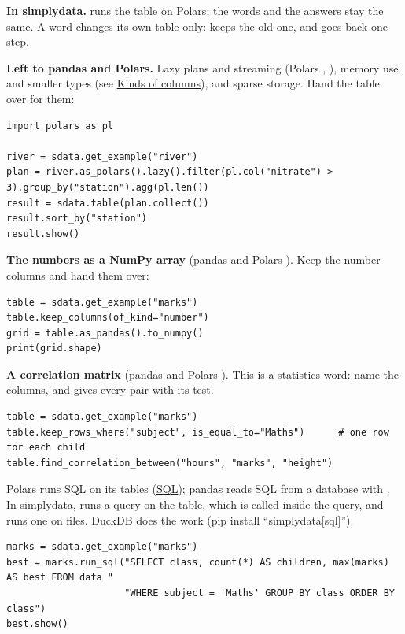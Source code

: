 \textbf{In simplydata.}  runs the table on Polars; the words and
the answers stay the same. A word changes its own table only:  keeps
the old one, and  goes back one step.

\textbf{Left to pandas and Polars.} Lazy plans and streaming (Polars ,
), memory use and smaller types (see
\hyperref[from-pandas:kinds]{Kinds of columns}), and sparse storage. Hand the table over for them:

\begin{lstlisting}[style=py]
import polars as pl

river = sdata.get_example("river")
plan = river.as_polars().lazy().filter(pl.col("nitrate") > 3).group_by("station").agg(pl.len())
result = sdata.table(plan.collect())
result.sort_by("station")
result.show()
\end{lstlisting}

\textbf{The numbers as a NumPy array} (pandas and Polars ). Keep the number columns and
hand them over:

\begin{lstlisting}[style=py]
table = sdata.get_example("marks")
table.keep_columns(of_kind="number")
grid = table.as_pandas().to_numpy()
print(grid.shape)
\end{lstlisting}

\textbf{A correlation matrix} (pandas and Polars ). This is a statistics word: name the
columns, and  gives every pair with its test.

\begin{lstlisting}[style=py]
table = sdata.get_example("marks")
table.keep_rows_where("subject", is_equal_to="Maths")      # one row for each child
table.find_correlation_between("hours", "marks", "height")
\end{lstlisting}


Polars runs SQL on its tables (\href{https://docs.pola.rs/user-guide/sql/intro/}{SQL}); pandas reads
SQL from a database with . In simplydata,  runs a query on the
table, which is called  inside the query, and  runs one on files. DuckDB
does the work (pip install ``simplydata[sql]'').

\begin{lstlisting}[style=py]
marks = sdata.get_example("marks")
best = marks.run_sql("SELECT class, count(*) AS children, max(marks) AS best FROM data "
                     "WHERE subject = 'Maths' GROUP BY class ORDER BY class")
best.show()
\end{lstlisting}

